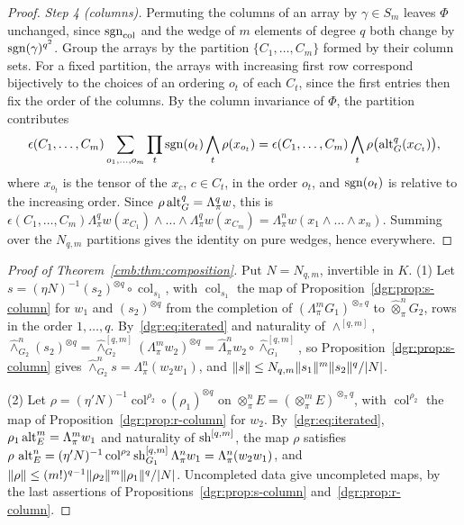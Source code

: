 \begin{proof}
\emph{Step 4 (columns).} Permuting the columns of an array by $\gamma\in S_m$ leaves $\Phi$ unchanged, since
$\operatorname{sgn}_{\mathrm{col}}$ and the wedge of $m$ elements of degree $q$ both change by $\operatorname{sgn}(\gamma)^{q^2}$. Group the arrays
by the partition $\{C_1,\dots,C_m\}$ formed by their column sets. For a fixed partition, the arrays with increasing first
row correspond bijectively to the choices of an ordering $o_t$ of each $C_t$, since the first entries then fix the order
of the columns. By the column invariance of $\Phi$, the partition contributes
\[
 \epsilon(C_1,\dots,C_m)\sum_{o_1,\dots,o_m}\prod_t\operatorname{sgn}(o_t)\bigwedge_t\rho(x_{o_t})
 =\epsilon(C_1,\dots,C_m)\bigwedge_t\rho\bigl(\operatorname{alt}^q_G(x_{C_t})\bigr),
\]
where $x_{o_t}$ is the tensor of the $x_c$, $c\in C_t$, in the order $o_t$, and $\operatorname{sgn}(o_t)$ is relative to the increasing
order. Since $\rho\operatorname{alt}^q_G=\Lambda^q_\pi w$, this is
$\epsilon(C_1,\dots,C_m)\Lambda^q_\pi w(x_{C_1})\wedge\dots\wedge\Lambda^q_\pi w(x_{C_m})
=\Lambda^n_\pi w(x_1\wedge\dots\wedge x_n)$. Summing over the $N_{q,m}$ partitions gives the identity on pure wedges,
hence everywhere.
\end{proof}

\begin{proof}[Proof of Theorem~\ref{cmb:thm:composition}]
Put $N=N_{q,m}$, invertible in $K$. (1) Let $s=(\eta N)^{-1}(s_2)^{\otimes q}\circ\operatorname{col}_{s_1}$, with
$\operatorname{col}_{s_1}$ the map of Proposition~\ref{dgr:prop:s-column} for $w_1$ and $(s_2)^{\otimes q}$ from the
completion of $(\Lambda^m_\pi G_1)^{\otimes_\pi q}$ to $\widehat\otimes^n_\pi G_2$, rows in the order $1,\dots,q$.
By~\eqref{dgr:eq:iterated} and naturality of $\wedge^{[q,m]}$,
$\widehat\wedge^n_{G_2}(s_2)^{\otimes q}=\widehat\wedge^{[q,m]}_{G_2}(\Lambda^m_\pi w_2)^{\otimes q}
=\widehat\Lambda^n_\pi w_2\circ\widehat\wedge^{[q,m]}_{G_1}$, so Proposition~\ref{dgr:prop:s-column} gives
$\widehat\wedge^n_{G_2}s=\Lambda^n_\pi(w_2w_1)$, and $\lVert s\rVert\le N_{q,m}\lVert s_1\rVert^m\lVert s_2\rVert^q/\lvert N\rvert$.

(2) Let $\rho=(\eta'N)^{-1}\operatorname{col}^{\rho_2}\circ(\rho_1)^{\otimes q}$ on
$\otimes^n_\pi E=(\otimes^m_\pi E)^{\otimes_\pi q}$, with $\operatorname{col}^{\rho_2}$ the map of
Proposition~\ref{dgr:prop:r-column} for $w_2$. By~\eqref{dgr:eq:iterated}, $\rho_1\operatorname{alt}^m_E=\Lambda^m_\pi w_1$ and
naturality of $\operatorname{sh}^{[q,m]}$, the map $\rho$ satisfies $\rho\,\operatorname{alt}^n_E=(\eta'N)^{-1}\operatorname{col}^{\rho_2}\operatorname{sh}^{[q,m]}_{G_1}\Lambda^n_\pi w_1
=\Lambda^n_\pi(w_2w_1)$, and $\lVert \rho\rVert\le(m!)^{q-1}\lVert \rho_2\rVert^m\lVert \rho_1\rVert^q/\lvert N\rvert$. Uncompleted data give
uncompleted maps, by the last assertions of Propositions~\ref{dgr:prop:s-column} and~\ref{dgr:prop:r-column}.
\end{proof}

